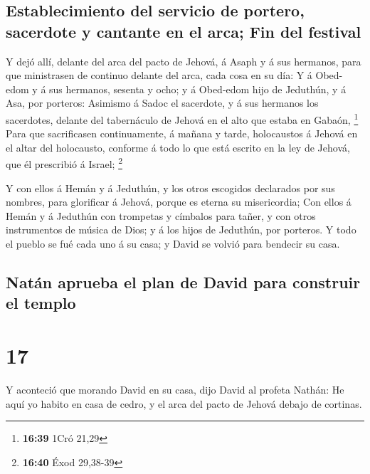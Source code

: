 \hypertarget{establecimiento-del-servicio-de-portero-sacerdote-y-cantante-en-el-arca-fin-del-festival}{%
\subsection{Establecimiento del servicio de portero, sacerdote y
cantante en el arca; Fin del
festival}\label{establecimiento-del-servicio-de-portero-sacerdote-y-cantante-en-el-arca-fin-del-festival}}

 Y dejó allí, delante del arca del pacto de Jehová, á Asaph
y á sus hermanos, para que ministrasen de continuo delante del arca,
cada cosa en su día:  Y á Obed-edom y á sus hermanos,
sesenta y ocho; y á Obed-edom hijo de Jeduthún, y á Asa, por porteros:
 Asimismo á Sadoc el sacerdote, y á sus hermanos los
sacerdotes, delante del tabernáculo de Jehová en el alto que estaba en
Gabaón, \footnote{\textbf{16:39} 1Cró 21,29}  Para que
sacrificasen continuamente, á mañana y tarde, holocaustos á Jehová en el
altar del holocausto, conforme á todo lo que está escrito en la ley de
Jehová, que él prescribió á Israel; \footnote{\textbf{16:40} Éxod
  29,38-39}

 Y con ellos á Hemán y á Jeduthún, y los otros escogidos
declarados por sus nombres, para glorificar á Jehová, porque es eterna
su misericordia;  Con ellos á Hemán y á Jeduthún con
trompetas y címbalos para tañer, y con otros instrumentos de música de
Dios; y á los hijos de Jeduthún, por porteros.  Y todo el
pueblo se fué cada uno á su casa; y David se volvió para bendecir su
casa.

\hypertarget{natuxe1n-aprueba-el-plan-de-david-para-construir-el-templo}{%
\subsection{Natán aprueba el plan de David para construir el
templo}\label{natuxe1n-aprueba-el-plan-de-david-para-construir-el-templo}}

\hypertarget{section-16}{%
\section{17}\label{section-16}}

 Y aconteció que morando David en su casa, dijo David al
profeta Nathán: He aquí yo habito en casa de cedro, y el arca del pacto
de Jehová debajo de cortinas.

